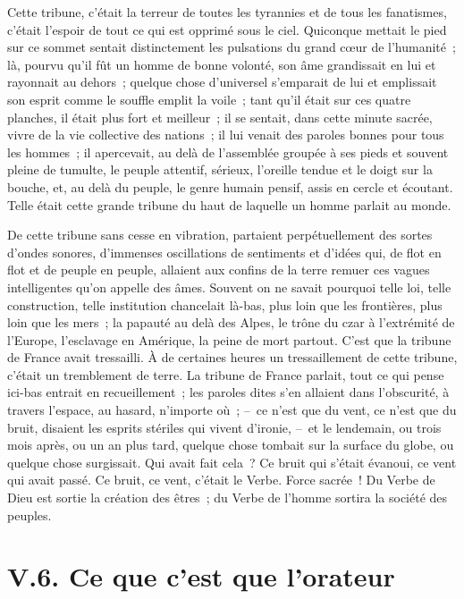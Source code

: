 \documentclass[french,twoside]{book} %
\begin{document}
\noindent Cette tribune, c’était la terreur de toutes les tyrannies et de tous les fanatismes, c’était l’espoir de tout ce qui est opprimé sous le ciel. Quiconque mettait le pied sur ce sommet sentait distinctement les pulsations du grand cœur de l’humanité ; là, pourvu qu’il fût un homme de bonne volonté, son âme grandissait en lui et rayonnait au dehors ; quelque chose d’universel s’emparait de lui et emplissait son esprit comme le souffle emplit la voile ; tant qu’il était sur ces quatre planches, il était plus fort et meilleur ; il se sentait, dans cette minute sacrée, vivre de la vie collective des nations ; il lui venait des paroles bonnes pour tous les hommes ; il apercevait, au delà de l’assemblée groupée à ses pieds et souvent pleine de tumulte, le peuple attentif, sérieux, l’oreille tendue et le doigt sur la bouche, et, au delà du peuple, le genre humain pensif, assis en cercle et écoutant. Telle était cette grande tribune du haut de laquelle un homme parlait au monde.\par
De cette tribune sans cesse en vibration, partaient perpétuellement des sortes d’ondes sonores, d’immenses oscillations de sentiments et d’idées qui, de flot en flot et de peuple en peuple, allaient aux confins de la terre remuer ces vagues intelligentes qu’on appelle des âmes. Souvent on ne savait pourquoi telle loi, telle construction, telle institution chancelait là-bas, plus loin que les frontières, plus loin que les mers ; la papauté au delà des Alpes, le trône du czar à l’extrémité de l’Europe, l’esclavage en Amérique, la peine de mort partout. C’est que la tribune de France avait tressailli. À de certaines heures un tressaillement de cette tribune, c’était un tremblement de terre. La tribune de France parlait, tout ce qui pense ici-bas entrait en recueillement ; les paroles dites s’en allaient dans l’obscurité, à travers l’espace, au hasard, n’importe où ; – ce n’est que du vent, ce n’est que du bruit, disaient les esprits stériles qui vivent d’ironie, – et le lendemain, ou trois mois après, ou un an plus tard, quelque chose tombait sur la surface du globe, ou quelque chose surgissait. Qui avait fait cela ? Ce bruit qui s’était évanoui, ce vent qui avait passé. Ce bruit, ce vent, c’était le Verbe. Force sacrée ! Du Verbe de Dieu est sortie la création des êtres ; du Verbe de l’homme sortira la société des peuples.

\section[{V.6. Ce que c’est que l’orateur}]{V.6. Ce que c’est que l’orateur}
\end{document}
